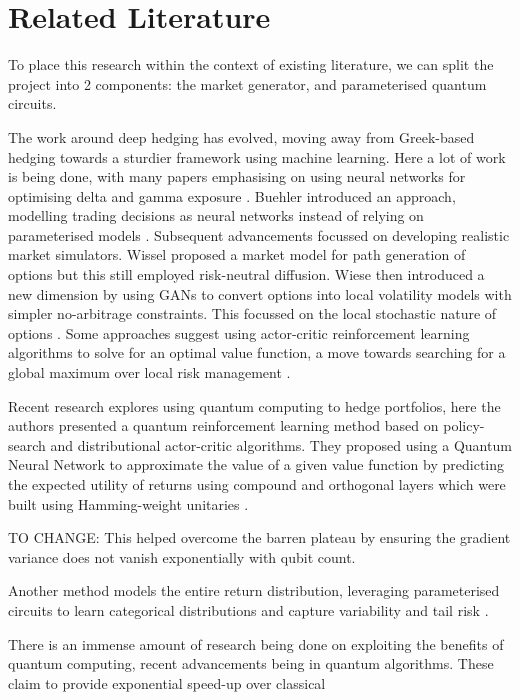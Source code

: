 \documentclass[12pt]{article}
\newcommand{\newp}
    {
    \vskip 0.5cm 
  }
\numberwithin{equation}{section}
\begin{document}
\section{Related Literature}
To place this research within the context of existing literature, we can split 
the project into 2 components: the market generator, and 
parameterised quantum circuits.
\newp
The work around deep hedging has evolved, moving away from 
Greek-based hedging towards a sturdier framework using machine 
learning. Here a lot of work is being done, with many papers emphasising 
on using neural networks for optimising delta and gamma exposure
\autocite{armstrong_deep_2024,qiao_enhancing_2024}.
Buehler introduced an approach, modelling trading decisions 
as neural networks instead of relying on parameterised models
\autocite{buehler_deep_2019}. Subsequent advancements focussed on developing 
realistic market simulators. Wissel 
proposed a market model for path generation of options but this still 
employed risk-neutral diffusion\autocite{schweizer_arbitrage-free_2008}. Wiese 
then introduced 
a new dimension by using GANs to convert options into 
local volatility models with simpler no-arbitrage constraints. This focussed 
on the local stochastic nature of options
\autocite{choudhary_funvol_2023,wiese_deep_2019,wiese_multi-asset_2021}.
Some approaches suggest using actor-critic reinforcement learning algorithms to 
solve for an optimal value function, a move towards searching for a global
maximum over local risk management
\autocite{buehler_deep_2022,movahed_introducing_2024}.
\newp
Recent research explores using quantum computing to 
hedge portfolios, here the authors presented a quantum reinforcement learning 
method based on policy-search and distributional actor-critic algorithms. 
They proposed using a Quantum Neural Network to approximate the value of a 
given value function by predicting the expected utility of returns using compound 
and orthogonal layers which were built using Hamming-weight
unitaries \autocite{kerenidis_classical_2022}. 
\newp TO CHANGE:
This helped overcome the barren 
plateau by ensuring the gradient 
variance does not vanish exponentially with qubit count. 
\newp
Another method models 
the entire return distribution, leveraging parameterised circuits to learn categorical 
distributions and capture variability and tail risk 
\autocite{cherrat_quantum_2023,dasgupta_loading_2022}.
\newp
There is an immense amount of research being done on exploiting the benefits of 
quantum computing, recent advancements being in quantum algorithms. 
These claim to provide exponential speed-up over classical 
\end{document}
